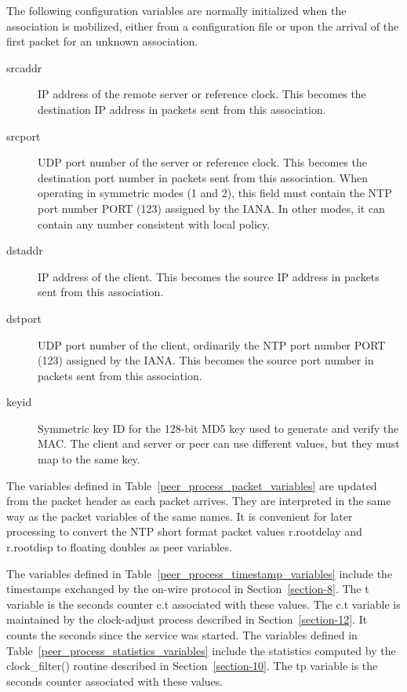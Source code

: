 The following configuration variables are normally initialized when
the association is mobilized, either from a configuration file or
upon the arrival of the first packet for an unknown association.

\begin{description}
  \item[srcaddr] IP address of the remote server or reference clock. This
becomes the destination IP address in packets sent from this
association.

  \item[srcport] UDP port number of the server or reference clock. This
becomes the destination port number in packets sent from this
association. When operating in symmetric modes (1 and 2), this field
must contain the NTP port number PORT (123) assigned by the IANA. In
other modes, it can contain any number consistent with local policy.

  \item[dstaddr] IP address of the client. This becomes the source IP
address in packets sent from this association.

  \item[dstport] UDP port number of the client, ordinarily the NTP port
number PORT (123) assigned by the IANA. This becomes the source port
number in packets sent from this association.

  \item[keyid] Symmetric key ID for the 128-bit MD5 key used to generate and
verify the MAC. The client and server or peer can use different
values, but they must map to the same key.
\end{description}

The variables defined in Table~\ref{peer_process_packet_variables} are updated from the packet header
as each packet arrives. They are interpreted in the same way as the
packet variables of the same names. It is convenient for later
processing to convert the NTP short format packet values r.rootdelay
and r.rootdisp to floating doubles as peer variables.

The variables defined in Table~\ref{peer_process_timestamp_variables} include the timestamps exchanged
by the on-wire protocol in Section~\ref{section-8}. The t variable is the seconds
counter c.t associated with these values. The c.t variable is
maintained by the clock-adjust process described in Section~\ref{section-12}. It
counts the seconds since the service was started. The variables
defined in Table~\ref{peer_process_statistics_variables} include the statistics computed by the
clock\_filter() routine described in Section~\ref{section-10}. The tp variable is
the seconds counter associated with these values.

